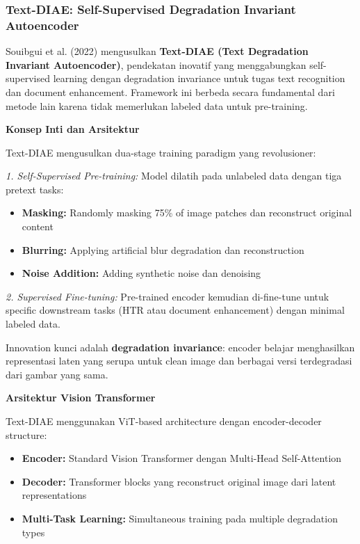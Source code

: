 \documentclass[12pt,a4paper]{article}
\begin{document}
\subsubsection{Text-DIAE: Self-Supervised Degradation Invariant Autoencoder}
\label{subsubsec:text-diae}

Souibgui et al. (2022) mengusulkan \textbf{Text-DIAE (Text Degradation Invariant Autoencoder)}, pendekatan inovatif yang menggabungkan self-supervised learning dengan degradation invariance untuk tugas text recognition dan document enhancement. Framework ini berbeda secara fundamental dari metode lain karena tidak memerlukan labeled data untuk pre-training.

\textbf{Konsep Inti dan Arsitektur}

Text-DIAE mengusulkan dua-stage training paradigm yang revolusioner:

\textit{1. Self-Supervised Pre-training:} Model dilatih pada unlabeled data dengan tiga pretext tasks:
\begin{itemize}
    \item \textbf{Masking:} Randomly masking 75\% of image patches dan reconstruct original content
    \item \textbf{Blurring:} Applying artificial blur degradation dan reconstruction
    \item \textbf{Noise Addition:} Adding synthetic noise dan denoising
\end{itemize}

\textit{2. Supervised Fine-tuning:} Pre-trained encoder kemudian di-fine-tune untuk specific downstream tasks (HTR atau document enhancement) dengan minimal labeled data.

Innovation kunci adalah \textbf{degradation invariance}: encoder belajar menghasilkan representasi laten yang serupa untuk clean image dan berbagai versi terdegradasi dari gambar yang sama.

\textbf{Arsitektur Vision Transformer}

Text-DIAE menggunakan ViT-based architecture dengan encoder-decoder structure:
\begin{itemize}
    \item \textbf{Encoder:} Standard Vision Transformer dengan Multi-Head Self-Attention
    \item \textbf{Decoder:} Transformer blocks yang reconstruct original image dari latent representations
    \item \textbf{Multi-Task Learning:} Simultaneous training pada multiple degradation types
\end{itemize}
\end{document}
